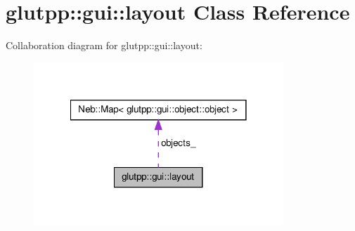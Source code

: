 \hypertarget{classglutpp_1_1gui_1_1layout}{\section{glutpp\-:\-:gui\-:\-:layout \-Class \-Reference}
\label{classglutpp_1_1gui_1_1layout}
}


\-Collaboration diagram for glutpp\-:\-:gui\-:\-:layout\-:\nopagebreak
\begin{figure}[H]
\begin{center}
\leavevmode
\includegraphics[width=266pt]{classglutpp_1_1gui_1_1layout__coll__graph}
\end{center}
\end{figure}
